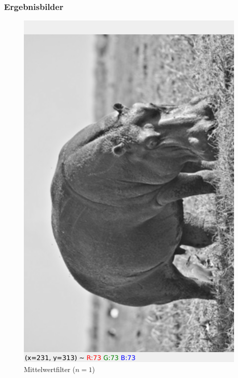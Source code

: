 \documentclass[12pt]{article}
\begin{document}
\subsubsection*{Ergebnisbilder}
\begin{figure}[H]
  \centering
  \begin{minipage}{0.49\textwidth}
    \centering
    \includegraphics[width=\textwidth, height=0.4\textheight, keepaspectratio]{average_1.png}
    Mittelwertfilter ($n = 1$)
  \end{minipage}
  \hfill
  \begin{minipage}{0.49\textwidth}
    \centering

\end{minipage}
\end{figure}
\end{document}
